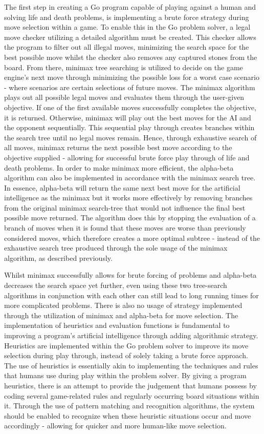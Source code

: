 \documentclass{l3proj}
\begin{document}
The first step in creating a Go program capable of playing against a human and solving life and death problems, is implementing a brute force strategy during move selection within a game. To enable this in the Go problem solver, a legal move checker utilizing a detailed algorithm must be created. This checker allows the program to filter out all illegal moves, minimizing the search space for the best possible move whilst the checker also removes any captured stones from the board. From there, minimax tree searching is utilized to decide on the game engine's next move through minimizing the possible loss for a worst case scenario - where scenarios are certain selections of future moves. The minimax algorithm plays out all possible legal moves and evaluates them through the user-given objective. If one of the first available moves successfully completes the objective, it is returned. Otherwise, minimax will play out the best moves for the AI and the opponent sequentially. This sequential play through creates branches within the search tree until no legal moves remain. Hence, through exhaustive search of all moves, minimax returns the next possible best move according to the objective supplied - allowing for successful brute force play through of life and death problems.
In order to make minimax more efficient, the alpha-beta algorithm can also be implemented in accordance with the minimax search tree. In essence, alpha-beta will return the same next best move for the artificial intelligence as the minimax but it works more effectively by removing branches from the original minimax search-tree that would not influence the final best possible move returned. The algorithm does this by stopping the evaluation of a branch of moves when it is found that these moves are worse than previously considered moves, which therefore creates a more optimal subtree - instead of the exhaustive search tree produced through the sole usage of the minimax algorithm, as described previously.

Whilst minimax successfully allows for brute forcing of problems and alpha-beta decreases the search space yet further, even using these two tree-search algorithms in conjunction with each other can still lead to long running times for more complicated problems. There is also no usage of strategy implemented through the utilization of minimax and alpha-beta for move selection. The implementation of heuristics and evaluation functions is fundamental to improving a program's artificial intelligence through adding algorithmic strategy. Heuristics are implemented within the Go problem solver to improve its move selection during play through, instead of solely taking a brute force approach. The use of heuristics is essentially akin to implementing the techniques and rules that humans use during play within the problem solver. By giving a program heuristics, there is an attempt to provide the judgement that humans possess by coding several game-related rules and regularly occurring board situations within it. Through the use of pattern matching and recognition algorithms, the system should be enabled to recognize when these heuristic situations occur and move accordingly - allowing for quicker and more human-like move selection.
\end{document}

